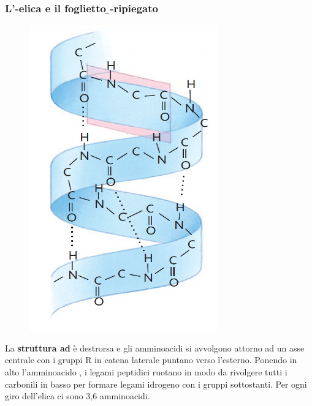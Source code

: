 \subsubsection{L'\texorpdfstring{\a}{α}-elica e il foglietto \texorpdfstring{\b}{β}-ripiegato}
\begin{minipage}{.4\textwidth}
	\begin{figure}[H]
		\centering
		\includegraphics{immagini/alpha-elica.jpg}
		\vspace{10pt}
	\end{figure}
\end{minipage}
\begin{minipage}{.55\textwidth}
	La \textbf{struttura ad } è destrorsa e gli amminoacidi si avvolgono attorno ad un asse centrale con i gruppi R in catena laterale puntano verso l'esterno. Ponendo in alto l’amminoacido , i legami peptidici ruotano in modo da rivolgere tutti i carbonili  in basso per formare legami idrogeno con i gruppi  sottostanti. Per ogni giro dell'elica ci sono 3,6 amminoacidi.
\end{minipage}

